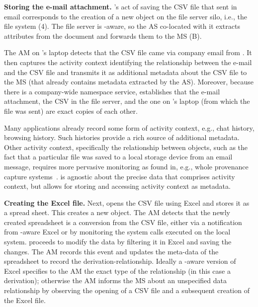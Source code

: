 \noindent\textbf{Storing the e-mail attachment.}
\persa's act of saving the CSV file that \persc sent in email corresponds to the creation of a new object on the file server silo, i.e., the file system (4). The file server is \system-aware, so the AS co-located with it extracts attributes from the document and forwards them to the MS (B).

The AM on \persa's laptop detects that the CSV file came via company email from \persc. It then captures the activity context identifying the relationship between the e-mail and the CSV file and transmits it as additional metadata about the CSV file to the MS (that already contains metadata extracted by the AS). Moreover, because there is a company-wide namespace service, \system establishes that the e-mail attachment, the CSV in the file server, and the one on \persc's laptop (from which the file was sent) are exact copies of each other. 

Many applications already record some form of activity context, e.g., chat history, browsing history. Such histories provide a rich source of additional metadata. Other activity context, specifically the relationship between objects, such as the fact that a particular file was saved to a local storage device from an email message, requires more pervasive monitoring as found in, e.g., whole provenance capture systems~\cite{camflow}. \system is agnostic about the precise data that comprises activity context, but allows for storing and accessing activity context as metadata. 

\noindent\textbf{Creating the Excel file.}
Next, \persa opens the CSV file using Excel and stores it as a spread sheet. This creates a new object. The AM detects that the newly created spreadsheet is a conversion from the CSV file, either via a notification from \system-aware Excel or by monitoring the system calls executed on the local system. \persa proceeds to modify the data by filtering it in Excel and saving the changes. The AM records this event and updates the meta-data of the spreadsheet to record the derivation-relationship. Ideally a \system-aware version of Excel specifies to the AM the exact type of the relationship (in this case a derivation); otherwise the AM informs the MS about an unspecified data relationship by observing the opening of a CSV file and a subsequent creation of the Excel file. 


